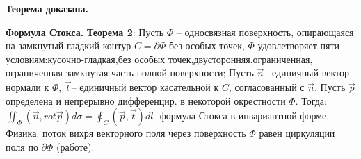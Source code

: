 \textbf{Теорема доказана.}

\par \textbf{Формула Стокса.} \textbf{Теорема 2}: Пусть $\Phi$ – односвязная поверхность, опирающаяся на замкнутый гладкий контур $C=\partial \Phi$ без особых точек, $\Phi$ удовлетворяет пяти условиям:кусочно-гладкая,без особых точек,двусторонняя,ограниченная, ограниченная замкнутая часть полной
поверхности; Пусть $\overrightarrow{n}$– единичный вектор нормали к $\Phi$, $\overrightarrow{t}$–
единичный вектор касательной к $C$, согласованный с $\overrightarrow{n}$. Пусть
$\overrightarrow{p}$ определена и непрерывно дифференцир.
в некоторой окрестности $\Phi$. Тогда:
$\iint _{\Phi }\left( \overrightarrow{n},rot\overrightarrow{p}\right) d\sigma=\oint _{C}\left( \overrightarrow{p},\overrightarrow{t}\right) dl$
-формула Стокса в инвариантной форме.
Физика: поток вихря векторного поля через поверхность $\Phi$ равен циркуляции поля по $\partial \Phi$ (работе).

